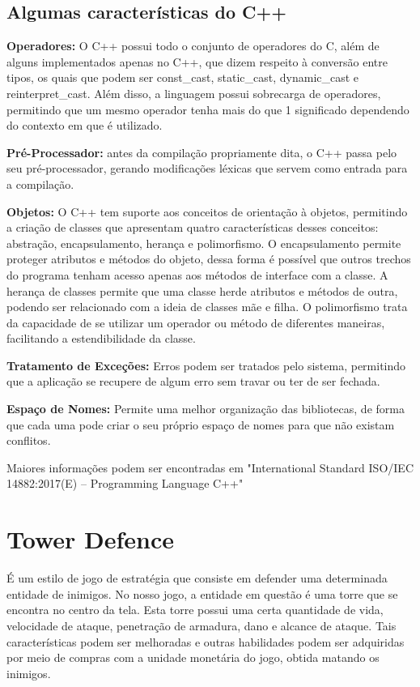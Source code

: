 \documentclass[rel_mlp]{iiufrgs}
\begin{document}
\section{Algumas características do C++}
 
	\textbf{Operadores:} O C++ possui todo o conjunto de operadores do C, além de alguns implementados apenas no C++, que dizem respeito à conversão entre tipos, os quais que podem ser const\_cast, static\_cast, dynamic\_cast e reinterpret\_cast. Além disso, a linguagem possui sobrecarga de operadores, permitindo que um mesmo operador tenha mais do que 1 significado dependendo do contexto em que é utilizado.

	\textbf{	Pré-Processador:} antes da compilação propriamente dita, o C++ passa pelo seu pré-processador, gerando modificações léxicas que servem como entrada para a compilação.

	\textbf{Objetos:} O C++ tem suporte aos conceitos de orientação à objetos, permitindo a criação de classes que apresentam quatro características desses conceitos: abstração, encapsulamento, herança e polimorfismo. O encapsulamento permite proteger atributos e métodos do objeto, dessa forma  é possível que outros trechos do programa tenham acesso apenas aos métodos de interface com a classe.	A herança de classes permite que uma classe herde atributos e métodos de outra, podendo ser relacionado com a ideia de classes mãe e filha. O polimorfismo trata da capacidade de se utilizar um operador ou método de diferentes maneiras, facilitando a estendibilidade da classe.

	\textbf{	Tratamento de Exceções:} Erros podem ser tratados pelo sistema, permitindo que a aplicação se recupere de algum erro sem travar ou ter de ser fechada.

	\textbf{Espaço de Nomes:} Permite uma melhor organização das bibliotecas, de forma que cada uma pode criar o seu próprio espaço de nomes para que não existam conflitos.
	
	Maiores informações podem ser encontradas em "International Standard ISO/IEC 14882:2017(E) – Programming Language C++"

\chapter{Tower Defence} \label{Tower Defence}
É um estilo de jogo de estratégia que consiste em defender uma determinada entidade de inimigos. No nosso jogo, a entidade em questão é uma torre que se encontra no centro da tela. Esta torre possui uma certa quantidade de vida, velocidade de ataque, penetração de armadura, dano e alcance de ataque. Tais características podem ser melhoradas e outras habilidades podem ser adquiridas por meio de compras com a unidade monetária do jogo, obtida matando os inimigos.
\end{document}
